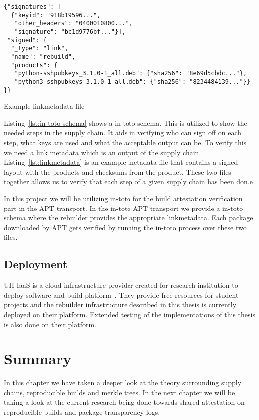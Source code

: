 \documentclass[../Main/thesis.tex]{subfiles}
\begin{document}
\begin{listing}[H]
\begin{verbatim}
{"signatures": [
  {"keyid": "918b19596...",
   "other_headers": "0400010800...",
   "signature": "bc1d9776bf..."}],
 "signed": {
  "_type": "link",
  "name": "rebuild",
  "products": {
   "python-sshpubkeys_3.1.0-1_all.deb": {"sha256": "8e69d5cbdc..."},
   "python3-sshpubkeys_3.1.0-1_all.deb": {"sha256": "8234484139..."}}
}}
\end{verbatim}
\caption{Example linkmetadata file}
\label{lst:linkmetadata}
\end{listing}

Listing~\ref{lst:in-toto-schema} shows a in-toto schema. This is utilized to
show the needed steps in the supply chain. It aids in verifying who can sign off
on each step, what keys are used and what the acceptable output can be. To
verify this we need a link metadata which is an output of the supply chain.
Listing~\ref{lst:linkmetadata} is an example metadata file that contains a
signed layout with the products and checksums from the product. These two files
together allows us to verify that each step of a given supply chain has been
don.e

In this project we will be utilizing in-toto for the build attestation
verification part in the APT transport. In the in-toto APT transport we provide a
in-toto schema where the rebuilder provides the appropriate linkmetadata. Each
package downloaded by APT gets verified by running the in-toto process over
these two files.


\subsection*{Deployment}%
\label{sub:deployment}
UH-IaaS is a cloud infrastructure provider created for research institution to
deploy software and build platform~\cite{uhiaas}. They provide free resources for student
projects and the rebuilder infrastructure described in this thesis is currently
deployed on their platform. Extended testing of the implementations of this
thesis is also done on their platform.


\section*{Summary}\label{sec:summary-technologies} 
In this chapter we have taken a deeper look at the theory surrounding supply
chains, reproducible builds and merkle trees. In the next chapter we will be
taking a look at the current research being done towards shared attestation on
reproducible builds and package transparency logs.
\end{document}
